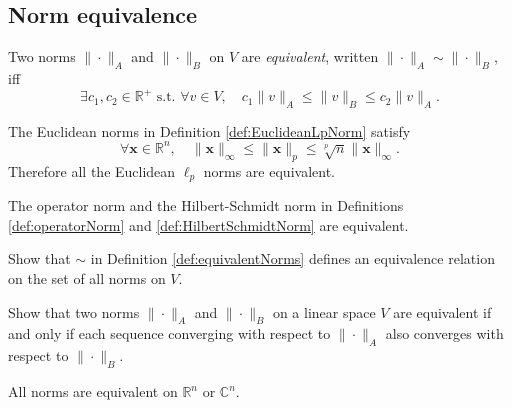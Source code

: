 \subsection{Norm equivalence}
\label{sec:norm-equivalence}

\begin{defn}
  \label{def:equivalentNorms}
  Two norms $\|\cdot\|_A$ and $\|\cdot\|_B$ on $V$ are
  \emph{equivalent}, written $\|\cdot\|_A\sim \|\cdot\|_B$, iff
  \begin{equation}
    \label{eq:equivalentNorms}
    \exists c_1, c_2\in \mathbb{R}^+ \text{ s.t. }
    \forall v\in V,\quad
    c_1\|v\|_A \le \|v\|_B \le c_2 \|v\|_A.
  \end{equation}
\end{defn}

\begin{exm}
  The Euclidean norms in Definition \ref{def:EuclideanLpNorm}
  satisfy
  \begin{equation}
    \label{eq:EuclideanNormsAreEquivalent}
    \forall \mathbf{x} \in \mathbb{R}^n,\quad
    \|\mathbf{x}\|_{\infty} \le \|\mathbf{x}\|_p
    \le \sqrt[p]{n} \|\mathbf{x}\|_{\infty}.
  \end{equation}
  Therefore all the Euclidean $\ell_p$ norms
  are equivalent.
\end{exm}

\begin{exm}
  The operator norm and the Hilbert-Schmidt norm
  in Definitions \ref{def:operatorNorm}
  and \ref{def:HilbertSchmidtNorm}
  are equivalent. 
\end{exm}

\begin{exc}
  \label{exc:equivalenceOfNorms}
  Show that $\sim$ in Definition \ref{def:equivalentNorms}
  defines an equivalence relation
  on the set of all norms on $V$.
\end{exc}

\begin{lem}
  \label{lem:normEquivCondViaConvergence}
  Show that two norms $\|\cdot\|_A$ and $\|\cdot\|_B$
  on a linear space $V$ are equivalent
  if and only if each sequence converging with respect to
  $\|\cdot\|_A$
  also converges with respect to $\|\cdot\|_B$.
\end{lem}

\begin{thm}
  \label{thm:normEquivalenceRn}
  All norms are equivalent on $\mathbb{R}^n$ or $\mathbb{C}^n$.
\end{thm}

